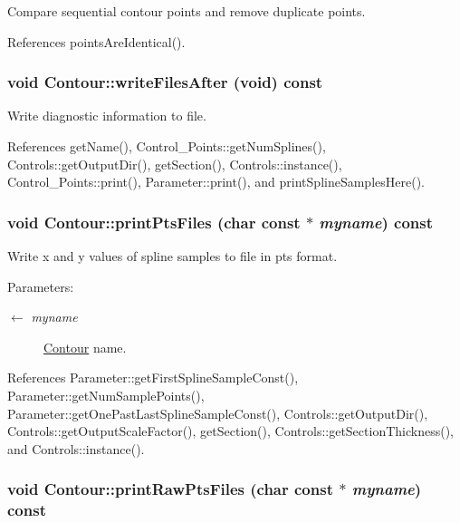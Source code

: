 Compare sequential contour points and remove duplicate points. 

References pointsAreIdentical().\hypertarget{classContour_12541e0e0d4cc193cfba7e939f4b0ae4}{
\subsubsection[writeFilesAfter]{\setlength{\rightskip}{0pt plus 5cm}void Contour::writeFilesAfter (void) const}}
\label{classContour_12541e0e0d4cc193cfba7e939f4b0ae4}


Write diagnostic information to file. 

References getName(), Control\_\-Points::getNumSplines(), Controls::getOutputDir(), getSection(), Controls::instance(), Control\_\-Points::print(), Parameter::print(), and printSplineSamplesHere().\hypertarget{classContour_f0e05e8412a7478801a879d8b18f2b54}{
\subsubsection[printPtsFiles]{\setlength{\rightskip}{0pt plus 5cm}void Contour::printPtsFiles (char const $\ast$ {\em myname}) const}}
\label{classContour_f0e05e8412a7478801a879d8b18f2b54}


Write x and y values of spline samples to file in pts format. \begin{Desc}
\item[Parameters:]
\begin{description}
\item[\mbox{$\leftarrow$} {\em myname}]\hyperlink{classContour}{Contour} name. \end{description}
\end{Desc}


References Parameter::getFirstSplineSampleConst(), Parameter::getNumSamplePoints(), Parameter::getOnePastLastSplineSampleConst(), Controls::getOutputDir(), Controls::getOutputScaleFactor(), getSection(), Controls::getSectionThickness(), and Controls::instance().\hypertarget{classContour_f0c59693fbb4d996a6211c46f6e6cf11}{
\subsubsection[printRawPtsFiles]{\setlength{\rightskip}{0pt plus 5cm}void Contour::printRawPtsFiles (char const $\ast$ {\em myname}) const}}
\label{classContour_f0c59693fbb4d996a6211c46f6e6cf11}



